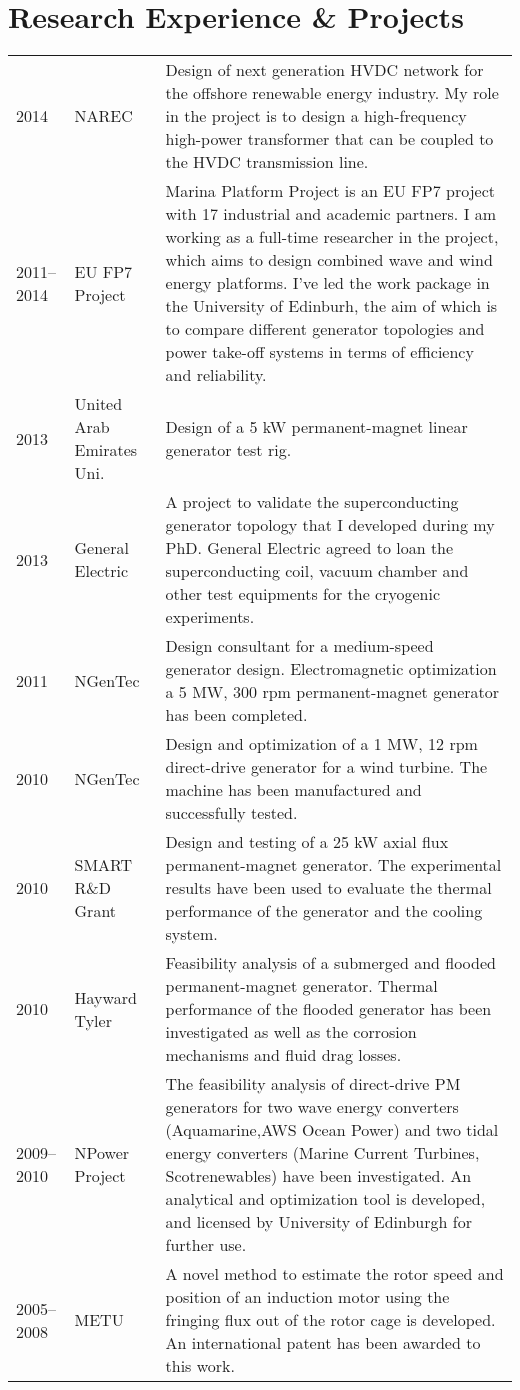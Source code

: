 \documentclass[a4paper,12pt]{article}
\begin{document}
\section{Research Experience \& Projects}
\begin{longtable}{lp{3cm}p{12cm}}
2014 & NAREC & Design of next generation HVDC network for the offshore renewable energy industry. My role in the project is to design a high-frequency high-power transformer that can be coupled to the HVDC transmission line.\\
2011--2014 & EU FP7 Project & Marina Platform Project is an EU FP7 project with 17 industrial and academic partners. I am working as a full-time researcher in the project, which aims to design combined wave and wind energy platforms. I've led the work package in the University of Edinburh, the aim of which is to compare different generator topologies and power take-off systems in terms of efficiency and reliability.\\
2013 & United Arab Emirates Uni. & Design of a 5 kW permanent-magnet linear generator test rig.\\
2013 & General Electric & A project to validate the superconducting generator topology that I developed during my PhD. General Electric agreed to loan the superconducting coil, vacuum chamber and other test equipments for the cryogenic experiments.\\
2011 & NGenTec & Design consultant for a medium-speed generator design. Electromagnetic optimization a 5 MW, 300 rpm permanent-magnet generator has been completed.\\
2010 & NGenTec & Design and optimization of a 1 MW, 12 rpm direct-drive generator for a wind turbine. The machine has been manufactured and successfully tested.\\
2010 & SMART R\&D Grant & Design and testing of a 25 kW axial flux permanent-magnet generator. The experimental results have been used to evaluate the thermal performance of the generator and the cooling system.\\
2010 & Hayward Tyler & Feasibility analysis of a
submerged and flooded permanent-magnet generator. Thermal performance of the flooded generator has been
investigated as well as the corrosion mechanisms and fluid drag losses.\\
2009--2010 & NPower Project & The feasibility analysis of direct-drive PM generators for two wave energy converters (Aquamarine,AWS Ocean Power) and two tidal energy converters (Marine Current Turbines, Scotrenewables) have been investigated. An analytical and optimization tool is developed, and licensed by University of Edinburgh for further use.\\
2005--2008 & METU & A novel method to estimate the rotor speed and position of an induction motor using the fringing flux out of the rotor cage is developed. An international patent has been awarded to this work.\\
\end{longtable}
\end{document}

